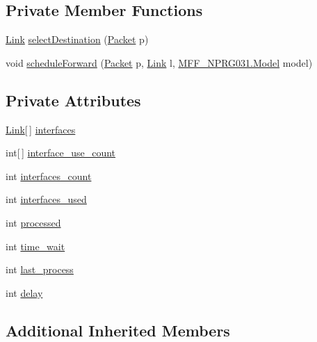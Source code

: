 \subsection*{Private Member Functions}
\begin{DoxyCompactItemize}
\item 
\hyperlink{classNetTrafficSimulator_1_1Link}{Link} \hyperlink{classNetTrafficSimulator_1_1NetworkNode_a7a6ad43dc664a81f590da8451f8f3b78}{select\-Destination} (\hyperlink{classNetTrafficSimulator_1_1Packet}{Packet} p)
\item 
void \hyperlink{classNetTrafficSimulator_1_1NetworkNode_a87e1e7c4b163bc96de4ccad302810b2c}{schedule\-Forward} (\hyperlink{classNetTrafficSimulator_1_1Packet}{Packet} p, \hyperlink{classNetTrafficSimulator_1_1Link}{Link} l, \hyperlink{classMFF__NPRG031_1_1Model}{M\-F\-F\-\_\-\-N\-P\-R\-G031.\-Model} model)
\end{DoxyCompactItemize}
\subsection*{Private Attributes}
\begin{DoxyCompactItemize}
\item 
\hyperlink{classNetTrafficSimulator_1_1Link}{Link}\mbox{[}$\,$\mbox{]} \hyperlink{classNetTrafficSimulator_1_1NetworkNode_a88683a8c65aadc6222a5898dcb1735d6}{interfaces}
\item 
int\mbox{[}$\,$\mbox{]} \hyperlink{classNetTrafficSimulator_1_1NetworkNode_a9746a8e4a6c1fc45c1404c9b3d2f8288}{interface\-\_\-use\-\_\-count}
\item 
int \hyperlink{classNetTrafficSimulator_1_1NetworkNode_af9b9d881f9c1b02749716bb12efb5f66}{interfaces\-\_\-count}
\item 
int \hyperlink{classNetTrafficSimulator_1_1NetworkNode_a2a2522005483827b9b7d3b51e7ffc47b}{interfaces\-\_\-used}
\item 
int \hyperlink{classNetTrafficSimulator_1_1NetworkNode_a4d81325b3290fd6521c682c8709b7e65}{processed}
\item 
int \hyperlink{classNetTrafficSimulator_1_1NetworkNode_ad05b46a64426469cee1bc3a0f494e4cb}{time\-\_\-wait}
\item 
int \hyperlink{classNetTrafficSimulator_1_1NetworkNode_afa8095929de9c6ccc20c2d47f8bdee9c}{last\-\_\-process}
\item 
int \hyperlink{classNetTrafficSimulator_1_1NetworkNode_aa31e2256ee97c759bd5f32652a5c00fc}{delay}
\end{DoxyCompactItemize}
\subsection*{Additional Inherited Members}


